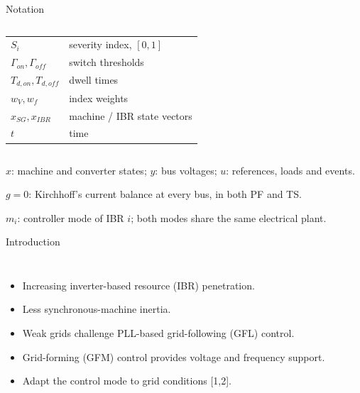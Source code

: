 \documentclass{beamer}
\begin{document}
\begin{frame}{Notation}
\begin{columns}[t,onlytextwidth]
\begin{tabular}{@{}p{1.85cm}p{3.05cm}@{}}
$S_i$ & severity index, $[0,1]$\\
$\Gamma_{on},\Gamma_{off}$ & switch thresholds\\
$T_{d,on},T_{d,off}$ & dwell times\\
$w_V,w_f$ & index weights\\
$x_{SG},x_{IBR}$ & machine / IBR state vectors\\
$t$ & time\\
\end{tabular}
\end{columns}
\medskip\scriptsize
$x$: machine and converter states; $y$: bus voltages; $u$: references, loads and events.\par
$g=0$: Kirchhoff's current balance at every bus, in both PF and TS.\par
$m_i$: controller mode of IBR $i$; both modes share the same electrical plant.\par
\end{frame}
\begin{frame}{Introduction}
\begin{columns}[c,onlytextwidth]
\small
\begin{itemize}\setlength{\itemsep}{.30cm}
\item Increasing inverter-based resource (IBR) penetration.
\item Less synchronous-machine inertia.
\item Weak grids challenge PLL-based grid-following (GFL) control.
\item Grid-forming (GFM) control provides voltage and frequency support.
\item Adapt the control mode to grid conditions [1,2].
\end{itemize}
\centering
{}
\end{columns}
\end{frame}
\end{document}
